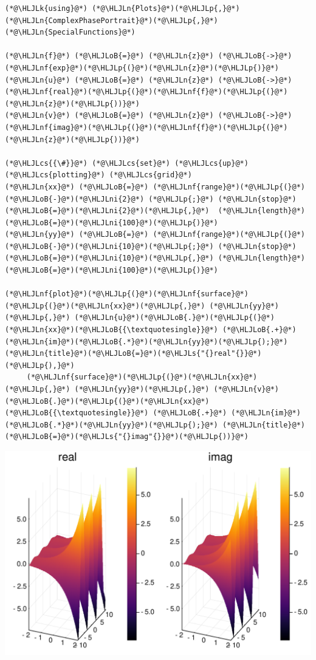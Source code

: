 \documentclass[12pt,a4paper]{article}
\newcommand{\HLJLk}[1]{\textcolor[RGB]{148,91,176}{\textbf{#1}}}
\newcommand{\HLJLn}[1]{#1}
\newcommand{\HLJLnf}[1]{\textcolor[RGB]{66,102,213}{#1}}
\newcommand{\HLJLs}[1]{\textcolor[RGB]{201,61,57}{#1}}
\newcommand{\HLJLni}[1]{\textcolor[RGB]{59,151,46}{#1}}
\newcommand{\HLJLoB}[1]{\textcolor[RGB]{102,102,102}{\textbf{#1}}}
\newcommand{\HLJLp}[1]{#1}
\newcommand{\HLJLcs}[1]{\textcolor[RGB]{153,153,119}{\textit{#1}}}
\begin{document}
\begin{lstlisting}
(*@\HLJLk{using}@*) (*@\HLJLn{Plots}@*)(*@\HLJLp{,}@*) (*@\HLJLn{ComplexPhasePortrait}@*)(*@\HLJLp{,}@*) (*@\HLJLn{SpecialFunctions}@*)

(*@\HLJLn{f}@*) (*@\HLJLoB{=}@*) (*@\HLJLn{z}@*) (*@\HLJLoB{->}@*) (*@\HLJLnf{exp}@*)(*@\HLJLp{(}@*)(*@\HLJLn{z}@*)(*@\HLJLp{)}@*)
(*@\HLJLn{u}@*) (*@\HLJLoB{=}@*) (*@\HLJLn{z}@*) (*@\HLJLoB{->}@*) (*@\HLJLnf{real}@*)(*@\HLJLp{(}@*)(*@\HLJLnf{f}@*)(*@\HLJLp{(}@*)(*@\HLJLn{z}@*)(*@\HLJLp{))}@*)
(*@\HLJLn{v}@*) (*@\HLJLoB{=}@*) (*@\HLJLn{z}@*) (*@\HLJLoB{->}@*) (*@\HLJLnf{imag}@*)(*@\HLJLp{(}@*)(*@\HLJLnf{f}@*)(*@\HLJLp{(}@*)(*@\HLJLn{z}@*)(*@\HLJLp{))}@*)

(*@\HLJLcs{{\#}}@*) (*@\HLJLcs{set}@*) (*@\HLJLcs{up}@*) (*@\HLJLcs{plotting}@*) (*@\HLJLcs{grid}@*)
(*@\HLJLn{xx}@*) (*@\HLJLoB{=}@*) (*@\HLJLnf{range}@*)(*@\HLJLp{(}@*)(*@\HLJLoB{-}@*)(*@\HLJLni{2}@*) (*@\HLJLp{;}@*) (*@\HLJLn{stop}@*)(*@\HLJLoB{=}@*)(*@\HLJLni{2}@*)(*@\HLJLp{,}@*)  (*@\HLJLn{length}@*)(*@\HLJLoB{=}@*)(*@\HLJLni{100}@*)(*@\HLJLp{)}@*)
(*@\HLJLn{yy}@*) (*@\HLJLoB{=}@*) (*@\HLJLnf{range}@*)(*@\HLJLp{(}@*)(*@\HLJLoB{-}@*)(*@\HLJLni{10}@*)(*@\HLJLp{;}@*) (*@\HLJLn{stop}@*)(*@\HLJLoB{=}@*)(*@\HLJLni{10}@*)(*@\HLJLp{,}@*) (*@\HLJLn{length}@*)(*@\HLJLoB{=}@*)(*@\HLJLni{100}@*)(*@\HLJLp{)}@*)

(*@\HLJLnf{plot}@*)(*@\HLJLp{(}@*)(*@\HLJLnf{surface}@*)(*@\HLJLp{(}@*)(*@\HLJLn{xx}@*)(*@\HLJLp{,}@*) (*@\HLJLn{yy}@*)(*@\HLJLp{,}@*) (*@\HLJLn{u}@*)(*@\HLJLoB{.}@*)(*@\HLJLp{(}@*)(*@\HLJLn{xx}@*)(*@\HLJLoB{{\textquotesingle}}@*) (*@\HLJLoB{.+}@*) (*@\HLJLn{im}@*)(*@\HLJLoB{.*}@*)(*@\HLJLn{yy}@*)(*@\HLJLp{);}@*) (*@\HLJLn{title}@*)(*@\HLJLoB{=}@*)(*@\HLJLs{"{}real"{}}@*)(*@\HLJLp{),}@*)
     (*@\HLJLnf{surface}@*)(*@\HLJLp{(}@*)(*@\HLJLn{xx}@*)(*@\HLJLp{,}@*) (*@\HLJLn{yy}@*)(*@\HLJLp{,}@*) (*@\HLJLn{v}@*)(*@\HLJLoB{.}@*)(*@\HLJLp{(}@*)(*@\HLJLn{xx}@*)(*@\HLJLoB{{\textquotesingle}}@*) (*@\HLJLoB{.+}@*) (*@\HLJLn{im}@*)(*@\HLJLoB{.*}@*)(*@\HLJLn{yy}@*)(*@\HLJLp{);}@*) (*@\HLJLn{title}@*)(*@\HLJLoB{=}@*)(*@\HLJLs{"{}imag"{}}@*)(*@\HLJLp{))}@*)
\end{lstlisting}

\includegraphics[width=\linewidth]{figures/Lecture1_1_1.pdf}
\end{document}
